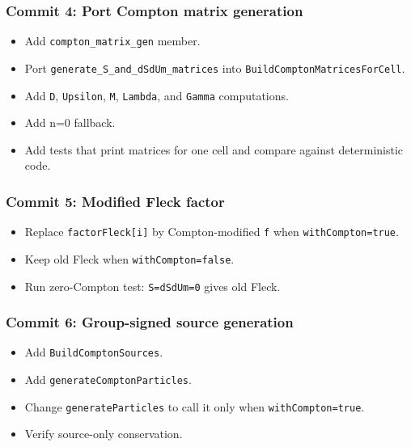\documentclass[
]{article}
\providecommand{\tightlist}{%
  \setlength{\itemsep}{0pt}\setlength{\parskip}{0pt}}
\begin{document}
\subsubsection{Commit 4: Port Compton matrix
generation}\label{commit-4-port-compton-matrix-generation}

\begin{itemize}
\tightlist
\item
  Add \texttt{compton\_matrix\_gen} member.
\item
  Port \texttt{generate\_S\_and\_dSdUm\_matrices} into
  \texttt{BuildComptonMatricesForCell}.
\item
  Add \texttt{D}, \texttt{Upsilon}, \texttt{M}, \texttt{Lambda}, and
  \texttt{Gamma} computations.
\item
  Add n=0 fallback.
\item
  Add tests that print matrices for one cell and compare against
  deterministic code.
\end{itemize}

\subsubsection{Commit 5: Modified Fleck
factor}\label{commit-5-modified-fleck-factor}

\begin{itemize}
\tightlist
\item
  Replace \texttt{factorFleck{[}i{]}} by Compton-modified \texttt{f}
  when \texttt{withCompton=true}.
\item
  Keep old Fleck when \texttt{withCompton=false}.
\item
  Run zero-Compton test: \texttt{S=dSdUm=0} gives old Fleck.
\end{itemize}

\subsubsection{Commit 6: Group-signed source
generation}\label{commit-6-group-signed-source-generation}

\begin{itemize}
\tightlist
\item
  Add \texttt{BuildComptonSources}.
\item
  Add \texttt{generateComptonParticles}.
\item
  Change \texttt{generateParticles} to call it only when
  \texttt{withCompton=true}.
\item
  Verify source-only conservation.
\end{itemize}
\end{document}
